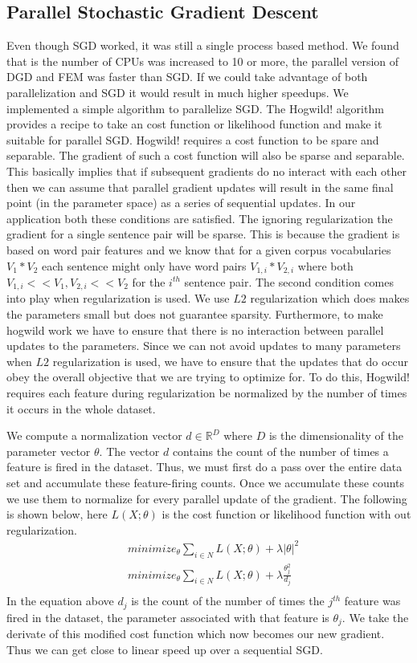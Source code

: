\documentclass[11pt,letterpaper]{article}
\begin{document}
\subsection*{Parallel Stochastic Gradient Descent}
Even though SGD worked, it was still a single process based method. We found that is the number of CPUs was increased to 10 or more, the parallel version of DGD and FEM was faster than SGD. If we could take advantage of both parallelization and SGD it would result in much higher speedups. We implemented a simple algorithm to parallelize SGD. The Hogwild! algorithm \cite{recht2011hogwild} provides a  recipe to take an cost function or likelihood function and make it suitable for parallel SGD. Hogwild! requires a cost function to be spare and separable. The gradient of such a cost function will also be sparse and separable. This basically implies that if subsequent gradients do no interact with each other then we can assume that parallel gradient updates will result in the same final point (in the parameter space) as a series of sequential updates. In our application both these conditions are satisfied. The ignoring regularization the gradient for a single sentence pair will be sparse. This is because the gradient is based on word pair features and we know that for a given corpus vocabularies $V_1 *V_2$ each sentence might only have word pairs $V_{1,i} * V_{2,i}$ where both $V_{1,i} << V_1, V_{2,i} << V_2$ for the $i^{th}$ sentence pair. The second condition comes into play when regularization is used. We use $L2$ regularization which does makes the parameters small but does not guarantee sparsity. Furthermore, to make hogwild work we have to ensure that there is no interaction between parallel updates to the parameters. Since we can not avoid updates to many parameters when $L2$ regularization is used, we have to ensure that the updates that do occur obey the overall objective that we are trying to optimize for. To do this, Hogwild! requires each feature during regularization be normalized by the number of times it occurs in the whole dataset.

We compute a normalization vector $d \in \mathbb{R}^D$ where $D$ is the dimensionality of the parameter vector $\theta$. The vector $d$ contains the count of the number of times a feature is fired in the dataset. Thus, we must first do a pass over the entire data set and accumulate these feature-firing counts. Once we accumulate these counts we use them to normalize for every parallel update of the gradient. The following is shown below, here $L(X;\theta)$ is the cost function or likelihood function with out regularization.
\begin{align*}
& minimize_\theta \sum_{i \in N} L(X;\theta) + \lambda|\theta|^2\\
& minimize_\theta \sum_{i \in N} L(X;\theta) + \lambda \frac{\theta_j^2}{d_j}\\
\end{align*}
In the equation above $d_j$ is the count of the number of times the $j^{th}$ feature was fired in the dataset, the parameter associated with that feature is $\theta_j$. We take the derivate of this modified cost function which now becomes our new gradient. Thus we can get close to linear speed up over a sequential SGD.
\end{document}
